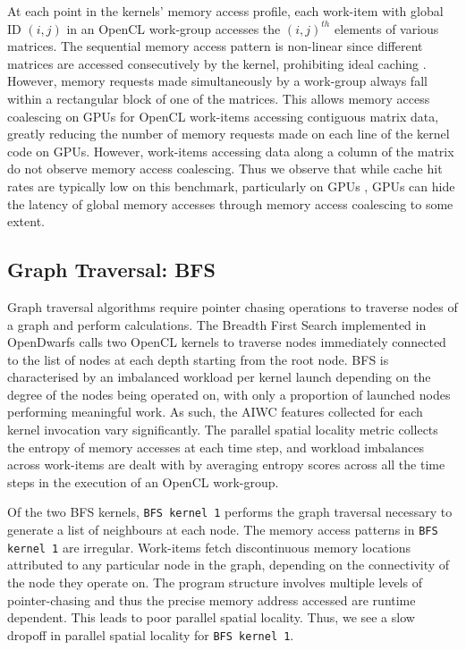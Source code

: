 \documentclass[review=false, sigchi]{acmart}
\begin{document}
	At each point in the kernels' memory access profile, each work-item with global ID $(i,j)$ in an OpenCL work-group accesses the $(i,j)^{th}$ elements of various matrices. The sequential memory access pattern is non-linear since different matrices are accessed consecutively by the kernel, prohibiting ideal caching \cite{krommydas2016opendwarfs}. However, memory requests made simultaneously by a work-group always fall within a rectangular block of one of the matrices. 
	This allows memory access coalescing on GPUs for OpenCL work-items accessing contiguous matrix data, greatly reducing the number of memory requests made on each line of the kernel code on GPUs. 
	However, work-items accessing data along a column of the matrix do not observe memory access coalescing.
	Thus we observe that while cache hit rates are typically low on this benchmark, particularly on GPUs \cite{krommydas2016opendwarfs}, GPUs can hide the latency of global memory accesses through memory access coalescing to some extent.
	
	\subsection{Graph Traversal: BFS}
	
	Graph traversal algorithms require pointer chasing operations to traverse nodes of a graph and perform calculations. 
	The Breadth First Search implemented in OpenDwarfs calls two OpenCL kernels to traverse nodes immediately connected to the list of nodes at each depth starting from the root node. 
	BFS is characterised by an imbalanced workload per kernel launch depending on the degree of the nodes being operated on, with only a proportion of launched nodes performing meaningful work. 
	As such, the AIWC features collected for each kernel invocation vary significantly. 
	The parallel spatial locality metric collects the entropy of memory accesses at each time step, and workload imbalances across work-items are dealt with by averaging entropy scores across all the time steps in the execution of an OpenCL work-group. 
	
	Of the two BFS kernels, \texttt{BFS kernel 1} performs the graph traversal necessary to generate a list of neighbours at each node. The memory access patterns in \texttt{BFS kernel 1} are irregular. 
	Work-items fetch discontinuous memory locations attributed to any particular node in the graph, depending on the connectivity of the node they operate on. 
	The program structure involves multiple levels of pointer-chasing and thus the precise memory address accessed are runtime dependent. 
	This leads to poor parallel spatial locality. Thus, we see a slow dropoff in parallel spatial locality for \texttt{BFS kernel 1}.
	
\end{document}

